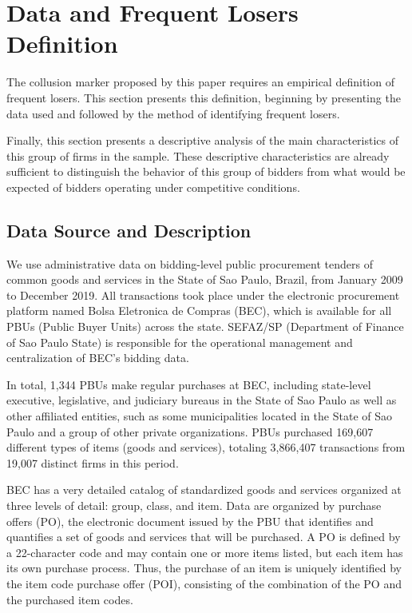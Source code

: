 \section{Data and Frequent Losers Definition}
\label{sec:data}

The collusion marker proposed by this paper requires an empirical definition of frequent losers. This section presents this definition, beginning by presenting the data used and followed by the method of identifying frequent losers.

Finally, this section presents a descriptive analysis of the main characteristics of this group of firms in the sample. These descriptive characteristics are already sufficient to distinguish the behavior of this group of bidders from what would be expected of bidders operating under competitive conditions.

\subsection{Data Source and Description}

We use administrative data on bidding-level public procurement tenders of common goods and services in the State of Sao Paulo, Brazil, from January 2009 to December 2019. All transactions took place under the electronic procurement platform named Bolsa Eletronica de Compras (BEC), which is available for all PBUs (Public Buyer Units) across the state. SEFAZ/SP (Department of Finance of Sao Paulo State) is responsible for the operational management and centralization of BEC's bidding data.

In total, 1,344 PBUs make regular purchases at BEC, including state-level executive, legislative, and judiciary bureaus in the State of Sao Paulo as well as other affiliated entities, such as some municipalities located in the State of Sao Paulo and a group of other private organizations. PBUs purchased 169,607 different types of items (goods and services), totaling 3,866,407 transactions from 19,007 distinct firms in this period.

BEC has a very detailed catalog of standardized goods and services organized at three levels of detail: group, class, and item. Data are organized by purchase offers (PO), the electronic document issued by the PBU that identifies and quantifies a set of goods and services that will be purchased. A PO is defined by a 22-character code and may contain one or more items listed, but each item has its own purchase process. Thus, the purchase of an item is uniquely identified by the item code purchase offer (POI), consisting of the combination of the PO and the purchased item codes.

